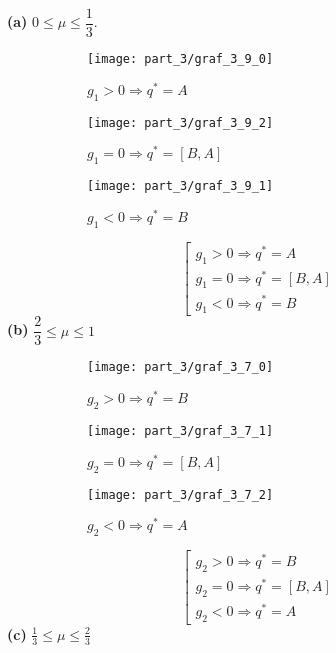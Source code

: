 \newpage
\textbf{(a)} 
$0 \leqslant \mu \leqslant \dfrac{1}{3}$. 	
\begin{figure}[H]
   	\centering
   	\begin{subfigure}[b]{0.3 \textwidth}
       	\centering
       	\texttt{[image: part\_3/graf\_3\_9\_0]}
       	\caption{$g_1 > 0 \Rightarrow q^*=A$}
       	\label{fig:y equals x}
   	\end{subfigure}
   	\begin{subfigure}[b]{0.3 \textwidth}
     	\centering
       	\texttt{[image: part\_3/graf\_3\_9\_2]}
       	\caption{$g_1 = 0 \Rightarrow q^*=[B,A]$}
       	\label{fig:three sin x}
   	\end{subfigure}
   	\begin{subfigure}[b]{0.3 \textwidth}
      	\centering
       	\texttt{[image: part\_3/graf\_3\_9\_1]}
       	\caption{$g_1 < 0 \Rightarrow q^*=B$}
       	\label{fig:three sin x}
   	\end{subfigure}
   	\caption{}
   	\label{fig:3_mu_0}
\end{figure}
$$
	\left[
	\begin{gathered}
		g_1 > 0 \Rightarrow q^*=A \\
		g_1 = 0 \Rightarrow q^*=[B,A] \\
		g_1 < 0 \Rightarrow q^*=B
	\end{gathered}
	\right.
$$
\textbf{(b)}
$\dfrac{2}{3} \leqslant \mu \leqslant 1$	
\begin{figure}[H]
   	\centering
   	\begin{subfigure}[b]{0.3 \textwidth}
      	\centering
       	\texttt{[image: part\_3/graf\_3\_7\_0]}
       	\caption{$g_2 > 0 \Rightarrow q^*=B$}
       	\label{fig:y equals x}
   	\end{subfigure}
   	\begin{subfigure}[b]{0.3 \textwidth}
       	\centering
       	\texttt{[image: part\_3/graf\_3\_7\_1]}
       	\caption{$g_2 = 0 \Rightarrow q^*=[B,A]$}
       	\label{fig:three sin x}
   	\end{subfigure}
   	\begin{subfigure}[b]{0.3 \textwidth}
      	\centering
       	\texttt{[image: part\_3/graf\_3\_7\_2]}
       	\caption{$g_2 < 0 \Rightarrow q^*=A$}
       	\label{fig:three sin x}
   	\end{subfigure}
   	\caption{}
\end{figure}	
$$
	\left[
	\begin{gathered}
		g_2 > 0 \Rightarrow q^*=B \\
		g_2 = 0 \Rightarrow q^*=[B,A] \\
		g_2 < 0 \Rightarrow q^*=A
	\end{gathered}
	\right.
$$
\textbf{(c)} 
$\frac{1}{3} \leqslant \mu \leqslant \frac{2}{3}$
	
